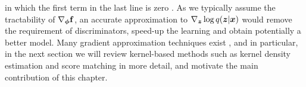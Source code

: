 in which the first term in the last line is zero \citep{roeder:sticking2017}. As we typically assume the tractability of $\nabla_{\bm{\phi}} \mathbf{f}$, an accurate approximation to $\nabla_{\bm{z}} \log q(\bm{z} | \bm{x})$ would remove the requirement of discriminators, speed-up the learning and obtain potentially a better model.
%
Many gradient approximation techniques exist \citep{stone:spline1985, fan:local_poly1996, zhou:spline2000, debrabanter:lpr2013}, and in particular, in the next section we will review kernel-based methods such as kernel density estimation \citep{singh:kernel_gradient1977} and score matching \citep{hyvarinen:score2005} in more detail, and motivate the main contribution of this chapter.

